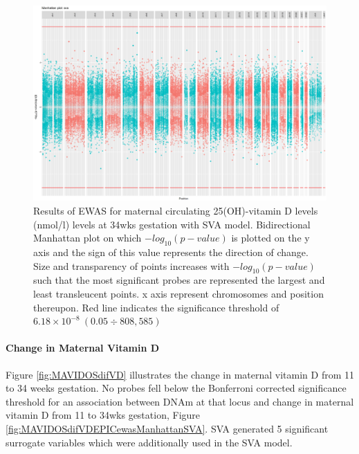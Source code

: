 \documentclass[
]{book}
\begin{document}
\begin{figure}

{\centering \includegraphics[width=0.8\linewidth]{figs/MAVIDOSmVitD34EPICewasManhattanSVA} 

}

\caption{Results of EWAS for maternal circulating 25(OH)-vitamin D levels (nmol/l) levels at 34wks gestation with SVA model. Bidirectional Manhattan plot on which \(-log_{10}(p-value)\) is plotted on the y axis and the sign of this value represents the direction of change. Size and transparency of points increases with \(-log_{10}(p-value)\) such that the most significant probes are represented the largest and least transleucent points. x axis represent chromosomes and position thereupon. Red line indicates the significance threshold of \(6.18\times10^{-8}~(0.05\div808,585)\)}\label{fig:MAVIDOSmVitD34EPICewasManhattanSVA}
\end{figure}



\hypertarget{change-in-maternal-vitamin-d}{%
\paragraph{Change in Maternal Vitamin D}\label{change-in-maternal-vitamin-d}}

Figure \ref{fig:MAVIDOSdifVD} illustrates the change in maternal vitamin D from 11 to 34 weeks gestation.
No probes fell below the Bonferroni corrected significance threshold for an association between DNAm at that locus and change in maternal vitamin D from 11 to 34wks gestation, Figure \ref{fig:MAVIDOSdifVDEPICewasManhattanSVA}.
SVA generated 5 significant surrogate variables which were additionally used in the SVA model.
\end{document}
